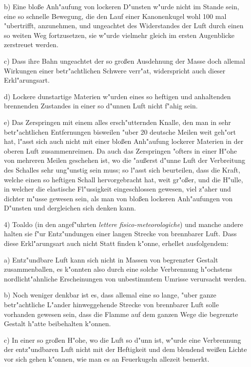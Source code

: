 \documentclass[a4paper, 11pt, oneside, polutonikogreek, german]{article}
\begin{document}
b) Eine bloße Anh"aufung von lockeren D"unsten w"urde nicht im Stande sein, eine so schnelle Bewegung, die den Lauf einer Kanonenkugel wohl 100 mal "ubertrifft, anzunehmen, und ungeachtet des Widerstandes der Luft durch einen so weiten Weg fortzusetzen, sie w"urde vielmehr gleich im ersten Augenblicke zerstreuet werden.

c) Dass ihre Bahn ungeachtet der so großen Ausdehnung der Masse doch allemal Wirkungen einer betr"achtlichen Schwere verr"at, widerspricht auch dieser Erkl"arungsart.

d) Lockere dunstartige Materien w"urden eines so heftigen und anhaltenden brennenden Zustandes in einer so d"unnen Luft nicht f"ahig sein.

e) Das Zerspringen mit einem alles ersch"utternden Knalle, den man in sehr betr"achtlichen Entfernungen bisweilen "uber 20 deutsche Meilen weit geh"ort hat, l"asst sich auch nicht mit einer bloßen Anh"aufung lockerer Materien in der oberen Luft zusammenreimen. Da auch das Zerspringen "ofters in einer H"ohe von mehreren Meilen geschehen ist, wo die "außerst d"unne Luft der Verbreitung des Schalles sehr ung"unstig sein muss; so l"asst sich beurteilen, dass die Kraft, welche einen so heftigen Schall hervorgebracht hat, weit gr"oßer, und die H"ulle, in welcher die elastische Fl"ussigkeit eingeschlossen gewesen, viel z"aher und dichter m"usse gewesen sein, als man von bloßen lockeren Anh"aufungen von D"unsten und dergleichen sich denken kann.

4) Toaldo (in den angef"uhrten \emph{lettere fisico-meteorologiche}) und manche andere halten sie f"ur Entz"undungen einer langen Strecke von brennbarer Luft. Dass diese Erkl"arungsart auch nicht Statt finden k"onne, erhellet ausfolgendem:

a) Entz"undbare Luft kann sich nicht in Massen von begrenzter Gestalt zusammenballen, es k"onnten also durch eine solche Verbrennung h"ochstens nordlicht"ahnliche Erscheinungen von unbestimmtem Umrisse verursacht werden.

b) Noch weniger denkbar ist es, dass allemal eine so lange, "uber ganze betr"achtliche L"ander hinweggehende Strecke von brennbarer Luft solle vorhanden gewesen sein, dass die Flamme auf dem ganzen Wege die begrenzte Gestalt h"atte beibehalten k"onnen.

c) In einer so großen H"ohe, wo die Luft so d"unn ist, w"urde eine Verbrennung der entz"undbaren Luft nicht mit der Heftigkeit und dem blendend weißen Lichte vor sich gehen k"onnen, wie man es an Feuerkugeln allezeit bemerkt.
\end{document}
